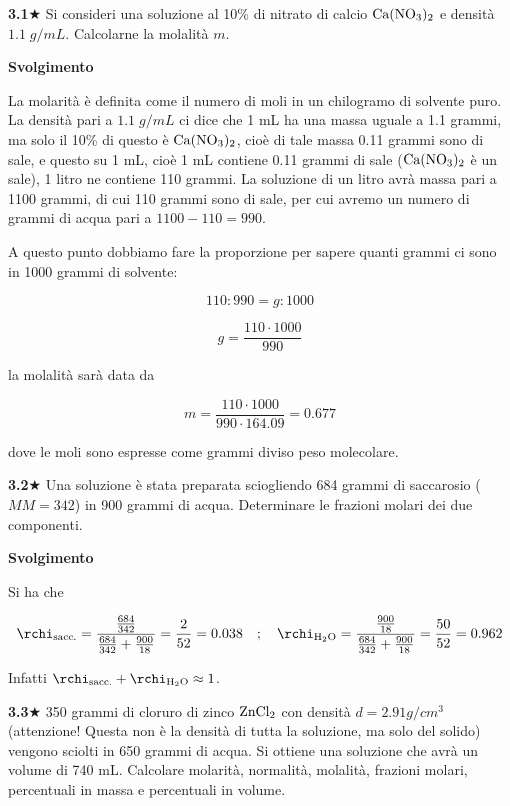 \textbf{3.1}$\bigstar$ Si consideri una soluzione al 10\% di nitrato di calcio $\rm Ca(NO_3)_2$ e densità $1.1\;g/mL$. Calcolarne la molalità $m$.

\vspace{0.2cm}\large\textbf{Svolgimento}\normalsize

\vspace{0.2cm}La molarità è definita come il numero di moli in un chilogramo di solvente puro. La densità pari a $1.1\;g/mL$ ci dice che 1 mL ha una massa uguale a 1.1 grammi, ma solo il 10\% di questo è $\rm Ca(NO_3)_2$, cioè di tale massa 0.11 grammi sono di sale, e questo su 1 mL, cioè 1 mL contiene 0.11 grammi di sale ($\rm Ca(NO_3)_2$ è un sale), 1 litro ne contiene 110 grammi. La soluzione di un litro avrà massa pari a 1100 grammi, di cui 110 grammi sono di sale, per cui avremo un numero di grammi di acqua pari a $1100-110=990$.

A questo punto dobbiamo fare la proporzione per sapere quanti grammi ci sono in 1000 grammi di solvente:

$$110:990=g:1000$$

$$g=\frac{110 \cdot 1000}{990}$$

la molalità sarà data da

$$m=\frac{110 \cdot 1000}{990 \cdot 164.09}=0.677$$

dove le moli sono espresse come grammi diviso peso molecolare.

\vspace{0.2cm}\textbf{3.2}$\bigstar$ Una soluzione è stata preparata sciogliendo 684 grammi di saccarosio ($MM=342$) in 900 grammi di acqua. Determinare le frazioni molari dei due componenti.

\vspace{0.2cm}\large\textbf{Svolgimento}\normalsize

\vspace{0.2cm}Si ha che

$$\rchi_{\text{sacc.}}=\frac{\frac{684}{342}}{\frac{684}{342} + \frac{900}{18}}=\frac{2}{52}=0.038
\quad;\quad
\rchi_{\text{H}_2\text{O}}=\frac{\frac{900}{18}}{\frac{684}{342} + \frac{900}{18}}=\frac{50}{52}=0.962$$

\vspace{0.2cm}Infatti $\rchi_{\text{sacc.}} + \rchi_{\text{H}_2\text{O}}\approx 1$.

\vspace{0.2cm}\textbf{3.3}$\bigstar$ 350 grammi di cloruro di zinco $\rm ZnCl_2$ con densità $d=2.91 g/cm^3$ (attenzione! Questa non è la densità di tutta la soluzione, ma solo del solido) vengono sciolti in 650 grammi di acqua. Si ottiene una soluzione che avrà un volume di 740 mL. Calcolare molarità, normalità, molalità, frazioni molari, percentuali in massa e percentuali in volume.

